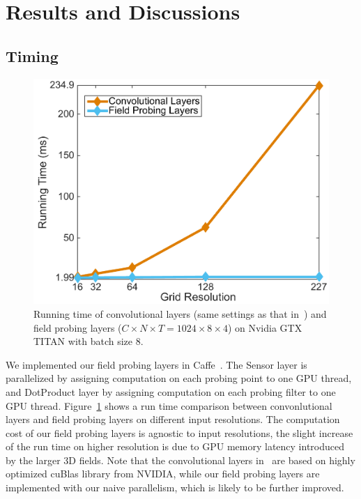 \section{Results and Discussions}
\label{sec:results_and_discussions}

\vspace{-0.2cm}

\subsection{Timing}

\begin{figure}
	\vspace{-2.7cm}
	\begin{center}
		\includegraphics[width=1.0\linewidth]{figures/timing_v2}
	\end{center}
	\vspace{-0.4cm}
	\caption{Running time of convolutional layers (same settings as that in~\protect\cite{WU_CVPR15_3D}) and field probing layers ($C \times N \times T = 1024 \times 8 \times 4$) on Nvidia GTX TITAN with batch size $8$\protect\footnotemark.}
	\label{fig:timing}
	\vspace{-0.2cm}
\end{figure}

We implemented our field probing layers in Caffe~\cite{Jia_arXiv14_Caffe}. The Sensor layer is parallelized by assigning computation on each probing point to one GPU thread, and DotProduct layer by assigning computation on each probing filter to one GPU thread. Figure~\ref{fig:timing} shows a run time comparison between convonlutional layers and field probing layers on different input resolutions. The computation cost of our field probing layers is agnostic to input resolutions, the slight increase of the run time on higher resolution is due to GPU memory latency introduced by the larger 3D fields. Note that the convolutional layers in~\cite{Jia_arXiv14_Caffe} are based on highly optimized cuBlas library from NVIDIA, while our field probing layers are implemented with our naive parallelism, which is likely to be further improved.

